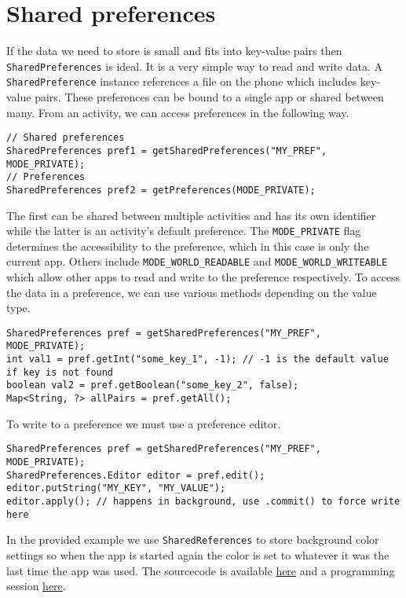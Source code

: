 \graphicspath{{./lab05/Images/}}


\maketocpage

\section{Shared preferences}
If the data we need to store is small and fits into key-value pairs then \texttt{SharedPreferences} is ideal. It is a very simple way to read and write data. A \texttt{SharedPreference} instance references a file on the phone which includes key-value pairs. These preferences can be bound to a single app or shared between many. From an activity, we can access preferences in the following way.
\begin{lstlisting}[style=A_Java]
// Shared preferences
SharedPreferences pref1 = getSharedPreferences("MY_PREF", MODE_PRIVATE);
// Preferences
SharedPreferences pref2 = getPreferences(MODE_PRIVATE);
\end{lstlisting}
The first can be shared between multiple activities and has its own identifier while the latter is an activity's default preference. The \texttt{MODE\_PRIVATE} flag determines the accessibility to the preference, which in this case is only the current app. Others include \texttt{MODE\_WORLD\_READABLE} and \texttt{MODE\_WORLD\_WRITEABLE} which allow other apps to read and write to the preference respectively. To access the data in a preference, we can use various methods depending on the value type.
\begin{lstlisting}[style=A_Java]
SharedPreferences pref = getSharedPreferences("MY_PREF", MODE_PRIVATE);
int val1 = pref.getInt("some_key_1", -1); // -1 is the default value if key is not found
boolean val2 = pref.getBoolean("some_key_2", false);
Map<String, ?> allPairs = pref.getAll();
\end{lstlisting}
To write to a preference we must use a preference editor.
\begin{lstlisting}[style=A_Java]
SharedPreferences pref = getSharedPreferences("MY_PREF", MODE_PRIVATE);
SharedPreferences.Editor editor = pref.edit();
editor.putString("MY_KEY", "MY_VALUE");
editor.apply(); // happens in background, use .commit() to force write here
\end{lstlisting}
In the provided example we use \texttt{SharedReferences} to store background color settings so when the app is started again the color is set to whatever it was the last time the app was used. The sourcecode is available \href{https://github.com/JonSteinn/AndroidDevelopment/tree/master/examples/lab5/colorpref}{here} and a programming session \href{TODO}{here}.

